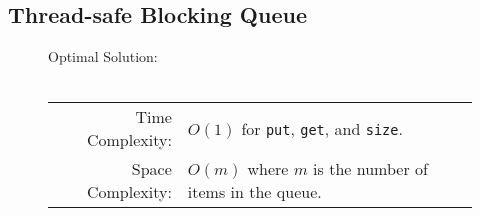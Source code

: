 
\subsection{Thread-safe Blocking Queue}

\begin{figure}[H]
    Optimal Solution:\\\\
    \begin{tabular}{rl}
        Time Complexity:& \(O(1)\) for \texttt{put},
        \texttt{get}, and \texttt{size}.\\
        Space Complexity:& \(O(m)\) where \(m\) is the number of items in the
        queue.
    \end{tabular}
\end{figure}

